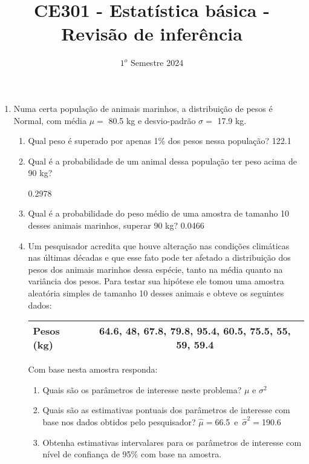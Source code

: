 \documentclass[
]{article}
\title{CE301 - Estatística básica - Revisão de inferência}
\author{}
\date{\vspace{-2.5em}\(1^o\) Semestre 2024}
\begin{document}
\maketitle

\begin{enumerate}

\item Numa certa população de animais marinhos, a distribuição de pesos é Normal, com média $\mu=$ 80.5 kg e desvio-padrão $\sigma=$ 17.9 kg.
\begin{enumerate}
\item Qual peso é superado por apenas 1\% dos pesos nessa população? 
122.1

\item Qual é a probabilidade de um animal dessa população ter peso acima de 90 kg? 

0.2978


\item Qual é a probabilidade do peso médio de uma amostra de tamanho 10 desses animais marinhos, superar 90 kg?
0.0466

\item Um pesquisador acredita que houve alteração nas condições climáticas nas últimas décadas e que esse fato pode ter afetado a distribuição dos pesos dos animais marinhos dessa espécie, tanto na média quanto na variância dos pesos. Para testar sua hipótese ele tomou uma amostra aleatória simples de tamanho 10 desses animais e obteve os seguintes dados: 

\begin{center}
\begin{tabular}{lc}
\hline
Pesos (kg)&64.6, 48, 67.8, 79.8, 95.4, 60.5, 75.5, 55, 59, 59.4 \\
\hline
\end{tabular}
\end{center}

Com base nesta amostra responda:
\begin{enumerate}
\item Quais são os parâmetros de interesse neste problema?
$\mu$ e $\sigma^2$
\item Quais são as estimativas pontuais dos parâmetros de interesse com base nos dados obtidos pelo pesquisador?
$\hat{\mu}=$66.5\ e\ $\hat{\sigma}^2=$190.6
\item Obtenha estimativas intervalares para os parâmetros de interesse com nível de confiança de 95\% com base na amostra. 


\end{enumerate}
\end{enumerate}
\end{enumerate}
\end{document}
